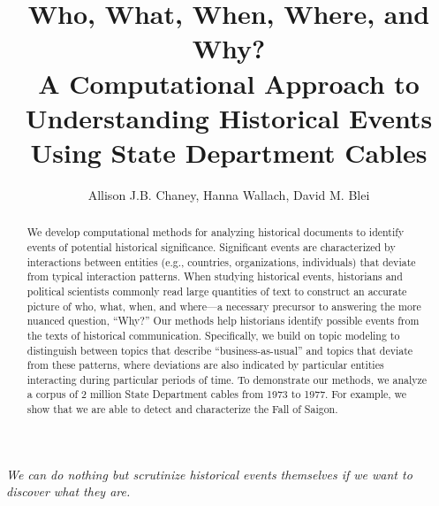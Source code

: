 



\usepackage{epigraph}



\title{Who, What, When, Where, and Why? \\ A Computational Approach to Understanding Historical Events Using State Department Cables}

\author{Allison J.B. Chaney, Hanna Wallach, David M. Blei}

\maketitle

\vspace{0.3in}

\begin{center}
\parbox{3.5in}{
\raggedright{
 	\emph{We can do nothing but scrutinize historical events themselves if we want to discover what they are.}}\\
\smallskip
{}
}
\end{center}

\vspace{0.5in}

\begin{abstract}
	We develop computational methods for analyzing historical documents to identify events of potential historical significance. Significant events are characterized by interactions between entities (e.g., countries, organizations, individuals) that deviate from typical interaction patterns. When studying historical events, historians and political scientists commonly read large quantities of text to construct an accurate picture of who, what, when, and where---a necessary precursor to answering the more nuanced question, ``Why?'' Our methods help historians identify possible events from the texts of historical communication. Specifically, we build on topic modeling to distinguish between topics that describe ``business-as-usual'' and topics that deviate from these patterns, where deviations are also indicated by particular entities interacting during particular periods of time. To demonstrate our methods, we analyze a corpus of 2 million State Department cables from 1973 to 1977.  For example, we show that we are able to detect and characterize the Fall of Saigon.
\end{abstract}


